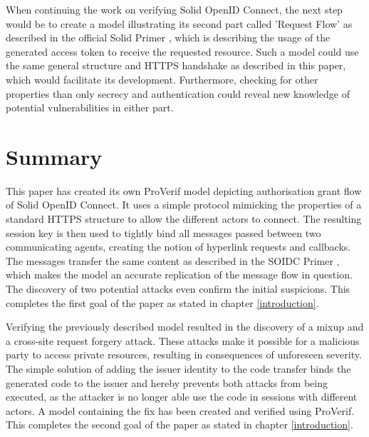 \documentclass[11pt,twoside,a4paper,openright]{book}
\begin{document}
When continuing the work on verifying Solid OpenID Connect, the next step would be to create a model illustrating its second part called 'Request Flow' as described in the official Solid Primer \cite{solidPrimer}, which is describing the usage of the generated access token to receive the requested resource. Such a model could use the same general structure and HTTPS handshake as described in this paper, which would facilitate its development. Furthermore, checking for other properties than only secrecy and authentication could reveal new knowledge of potential vulnerabilities in either part.


\chapter{Summary}
\label{summary}

This paper has created its own ProVerif model depicting authorisation grant flow of Solid OpenID Connect. It uses a simple protocol mimicking the properties of a standard HTTPS structure to allow the different actors to connect. The resulting session key is then used to tightly bind all messages passed between two communicating agents, creating the notion of hyperlink requests and callbacks. The messages transfer the same content as described in the SOIDC Primer \cite{solidPrimer}, which makes the model an accurate replication of the message flow in question. The discovery of two potential attacks even confirm the initial suspicions. This completes the first goal of the paper as stated in chapter \ref{introduction}.

Verifying the previously described model resulted in the discovery of a mixup and a cross-site request forgery attack. These attacks make it possible for a malicious party to access private resources, resulting in consequences of unforeseen severity. The simple solution of adding the issuer identity to the code transfer binds the generated code to the issuer and hereby prevents both attacks from being executed, as the attacker is no longer able use the code in sessions with different actors. A model containing the fix has been created and verified using ProVerif. This completes the second goal of the paper as stated in chapter \ref{introduction}. 
\end{document}
